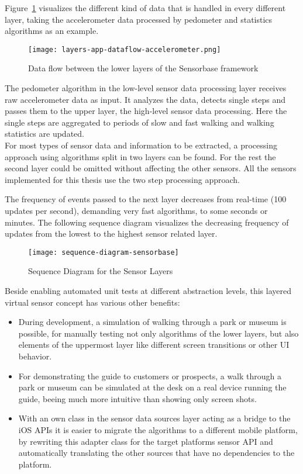 Figure~\ref{fig:dataflow} visualizes the different kind of data that is handled in every different layer, taking the accelerometer data processed by pedometer and statistics algorithms as an example. 

\begin{figure}[H]
\centering
\texttt{[image: layers-app-dataflow-accelerometer.png]}
\caption{Data flow between the lower layers of the Sensorbase framework}
\label{fig:dataflow}
\end{figure}

The pedometer algorithm in the low-level sensor data processing layer receives raw accelerometer data as input. It analyzes the data, detects single steps and passes them to the upper layer, the high-level sensor data processing. Here the single steps are aggregated to periods of slow and fast walking and walking statistics are updated.\\
For most types of sensor data and information to be extracted, a processing approach using algorithms split in two layers can be found. For the rest the second layer could be omitted without affecting the other sensors. All the sensors implemented for this thesis use the two step processing approach.

The frequency of events passed to the next layer decreases from real-time (100 updates per second), demanding very fast algorithms, to some seconds or minutes. The following sequence diagram visualizes the decreasing frequency of updates from the lowest to the highest sensor related layer.

\begin{figure}[H]
\centering
\texttt{[image: sequence-diagram-sensorbase]}
\caption{Sequence Diagram for the Sensor Layers}
\end{figure}

Beside enabling automated unit tests at different abstraction levels, this layered virtual sensor concept has various other benefits:

\begin{itemize}
\item During development, a simulation of walking through a park or museum is possible, for manually testing not only algorithms of the lower layers, but also elements of the uppermost layer like different screen transitions or other UI behavior.
\item For demonstrating the guide to customers or prospects, a walk through a park or museum can be simulated at the desk on a real device running the guide, beeing much more intuitive than showing only screen shots.
\item With an own class in the sensor data sources layer acting as a bridge to the iOS APIs it is easier to migrate the algorithms to a different mobile platform, by rewriting this adapter class for the target platforms sensor API and automatically translating the other sources that have no dependencies to the platform.
\end{itemize}


